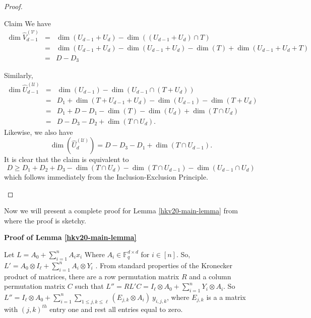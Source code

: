 \begin{proof}
\begin{proofof}{Claim}
We have 
\begin{eqnarray*}
\dim \hat{V}_{d-1}^{(\mathcal{V})} &=& \dim (U_{d-1}+U_d)-\dim ((U_{d-1}+U_d) \cap T)\\
&=&\dim (U_{d-1}+U_d)-\dim (U_{d-1}+U_d)-\dim (T) + \dim (U_{d-1}+U_d+T)\\
&=& D-D_3
\end{eqnarray*}

%
%
%
%

Similarly,
\begin{eqnarray*}
\dim  \hat{U}_{d-1}^{(\mathcal{U})}  &=& \dim (U_{d-1}) - \dim (U_{d-1} \cap (T+ U_d))\\
&=&D_1 + \dim (T+U_{d-1}+U_d)- \dim (U_{d-1}) - \dim (T+U_d)\\
&=&D_1 +D -D_1- \dim (T)-\dim (U_d)+\dim (T \cap U_d)\\
&=& D-D_3-D_2 + \dim(T \cap U_d). 
\end{eqnarray*}
Likewise, we also have
\[
\dim ( \hat{U}_{d}^{(\mathcal{U})} )=D-D_3-D_1+ \dim (T \cap U_{d-1}).
\]
It is clear that the claim is equivalent to
\[
 D \geq D_1 + D_2 + D_3 - \dim (T \cap U_d) - \dim (T \cap U_{d-1})-
 \dim (U_{d-1} \cap U_d)
 \]
which follows immediately from the Inclusion-Exclusion Principle. 
\end{proofof}
\end{proof}

%
%
%

Now we will present a complete proof for Lemma \ref{hkv20-main-lemma}
from \cite{HKV20} where the proof is sketchy.\smallskip
 
{\bf Proof of Lemma \ref{hkv20-main-lemma} }

Let $L=A_0 + \sum_{i=1}^n A_i x_i$ Where $A_i \in \mathbb{F}_q^{d
  \times d}$ for $i \in [n]$. So, $L'= A_0 \otimes I_\ell +
\sum_{i=1}^{n} A_i \otimes Y_i$ . From standard properties of the
Kronecker product of matrices, there are a row permutation matrix $R$
and a column permutation matrix $C$ such that $L''= RL'C = I_\ell
\otimes A_0 + \sum_{i=1}^n Y_i \otimes A_i$. So $L'' = I_\ell \otimes
A_0 + \sum_{i=1}^n \sum_{1 \leq j, k \leq \ell} (E_{j,k} \otimes A_i)~
y_{i,j,k}$, where $E_{j,k}$ is a a matrix with $(j,k)^{th}$ entry one
and rest all entries equal to zero.
     
